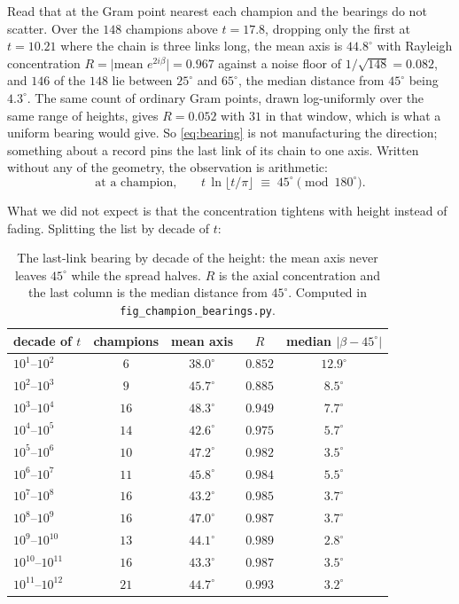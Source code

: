 \documentclass[11pt]{article}
\theoremstyle{definition}
\begin{document}
Read that at the Gram point nearest each champion and the bearings do not
scatter. Over the $148$ champions above $t=17.8$, dropping only the first at
$t=10.21$ where the chain is three links long, the mean axis is $44.8^{\circ}$
with Rayleigh concentration $R=\bigl|\text{mean }e^{2i\beta}\bigr|=0.967$ against
a noise floor of $1/\sqrt{148}=0.082$, and $146$ of the $148$ lie between
$25^{\circ}$ and $65^{\circ}$, the median distance from $45^{\circ}$ being
$4.3^{\circ}$. The same count of ordinary Gram points, drawn log-uniformly over
the same range of heights, gives $R=0.052$ with $31$ in that window, which is
what a uniform bearing would give. So \eqref{eq:bearing} is not manufacturing the
direction; something about a record pins the last link of its chain to one axis.
Written without any of the geometry, the observation is arithmetic:
\begin{equation}\label{eq:champ-arith}
\text{at a champion,}\qquad
t\,\ln\lfloor t/\pi\rfloor\;\equiv\;45^{\circ}\pmod{180^{\circ}} .
\end{equation}

What we did not expect is that the concentration tightens with height instead of
fading. Splitting the list by decade of $t$:

\begin{table}[H]
\centering
\small
\caption{The last-link bearing by decade of the height: the mean axis never
leaves $45^{\circ}$ while the spread halves. $R$ is the axial concentration and
the last column is the median distance from $45^{\circ}$. Computed in
\texttt{fig\_champion\_bearings.py}.}
\label{tab:champ-bearings}
\begin{tabular}{lcccc}
\toprule
decade of $t$ & champions & mean axis & $R$ & median $|\beta-45^{\circ}|$ \\
\midrule
$10^{1}$--$10^{2}$  & $6$  & $38.0^{\circ}$ & $0.852$ & $12.9^{\circ}$ \\
$10^{2}$--$10^{3}$  & $9$  & $45.7^{\circ}$ & $0.885$ & $8.5^{\circ}$ \\
$10^{3}$--$10^{4}$  & $16$ & $48.3^{\circ}$ & $0.949$ & $7.7^{\circ}$ \\
$10^{4}$--$10^{5}$  & $14$ & $42.6^{\circ}$ & $0.975$ & $5.7^{\circ}$ \\
$10^{5}$--$10^{6}$  & $10$ & $47.2^{\circ}$ & $0.982$ & $3.5^{\circ}$ \\
$10^{6}$--$10^{7}$  & $11$ & $45.8^{\circ}$ & $0.984$ & $5.5^{\circ}$ \\
$10^{7}$--$10^{8}$  & $16$ & $43.2^{\circ}$ & $0.985$ & $3.7^{\circ}$ \\
$10^{8}$--$10^{9}$  & $16$ & $47.0^{\circ}$ & $0.987$ & $3.7^{\circ}$ \\
$10^{9}$--$10^{10}$ & $13$ & $44.1^{\circ}$ & $0.989$ & $2.8^{\circ}$ \\
$10^{10}$--$10^{11}$& $16$ & $43.3^{\circ}$ & $0.987$ & $3.5^{\circ}$ \\
$10^{11}$--$10^{12}$& $21$ & $44.7^{\circ}$ & $0.993$ & $3.2^{\circ}$ \\
\bottomrule
\end{tabular}
\end{table}
\end{document}

